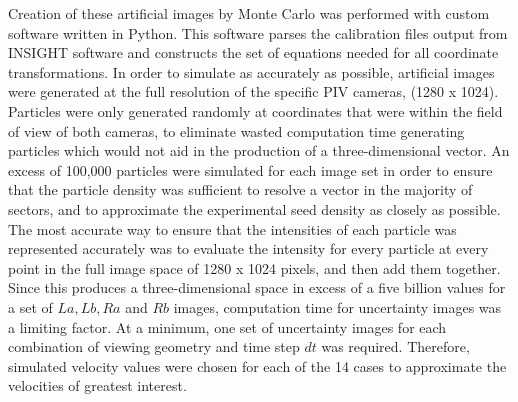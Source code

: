 Creation of these artificial images by Monte Carlo was performed with custom 
software written in Python\texttrademark. This software parses the calibration 
files output 
from INSIGHT software and constructs the set of equations needed for all 
coordinate transformations. In order to simulate as accurately as possible, 
artificial images were generated at the full resolution of the specific PIV 
cameras, (1280 x 1024). Particles were only generated randomly at coordinates 
that were within the field of view of both cameras, to eliminate wasted 
computation time generating particles which would not aid in the production of 
a three-dimensional vector. An excess of 100,000 particles were simulated for 
each image set in order to ensure that the particle density was sufficient to 
resolve a vector in the majority of sectors, and to approximate the 
experimental seed density as closely as possible. The most accurate way to 
ensure that the intensities of each particle was represented accurately was to 
evaluate the intensity for every particle at every point in the full image 
space of 1280 x 1024 pixels, and then add them together. Since this produces a 
three-dimensional space in excess 
of a five billion values for a set of $La, Lb, Ra$ and $Rb$ images, computation 
time for uncertainty images was a limiting factor. At a minimum, one set of 
uncertainty images for each combination of viewing geometry and time step $dt$ 
was required. Therefore, simulated velocity values were chosen for each of the 
14 cases to approximate the velocities of greatest interest. 

